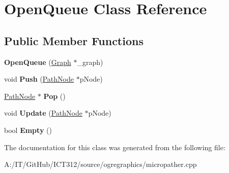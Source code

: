 \hypertarget{class_open_queue}{\section{Open\-Queue Class Reference}
\label{class_open_queue}
}
\subsection*{Public Member Functions}
\begin{DoxyCompactItemize}
\item 
\hypertarget{class_open_queue_a7cb6c7b5fbc5e8a18c52b156e4a7c02c}{{\bfseries Open\-Queue} (\hyperlink{classmicropather_1_1_graph}{Graph} $\ast$\-\_\-graph)}\label{class_open_queue_a7cb6c7b5fbc5e8a18c52b156e4a7c02c}

\item 
\hypertarget{class_open_queue_ace3a421a6b5cb4b8df68f31bf7bc2722}{void {\bfseries Push} (\hyperlink{classmicropather_1_1_path_node}{Path\-Node} $\ast$p\-Node)}\label{class_open_queue_ace3a421a6b5cb4b8df68f31bf7bc2722}

\item 
\hypertarget{class_open_queue_a549615551c138f1bfb8bdff64f884215}{\hyperlink{classmicropather_1_1_path_node}{Path\-Node} $\ast$ {\bfseries Pop} ()}\label{class_open_queue_a549615551c138f1bfb8bdff64f884215}

\item 
\hypertarget{class_open_queue_a001ae9ef55a83a3749b62280688b2670}{void {\bfseries Update} (\hyperlink{classmicropather_1_1_path_node}{Path\-Node} $\ast$p\-Node)}\label{class_open_queue_a001ae9ef55a83a3749b62280688b2670}

\item 
\hypertarget{class_open_queue_ab18ef2e2cbc38ebbdf44003a05575ada}{bool {\bfseries Empty} ()}\label{class_open_queue_ab18ef2e2cbc38ebbdf44003a05575ada}

\end{DoxyCompactItemize}


The documentation for this class was generated from the following file\-:\begin{DoxyCompactItemize}
\item 
A\-:/\-I\-T/\-Git\-Hub/\-I\-C\-T312/source/ogregraphics/micropather.\-cpp\end{DoxyCompactItemize}
